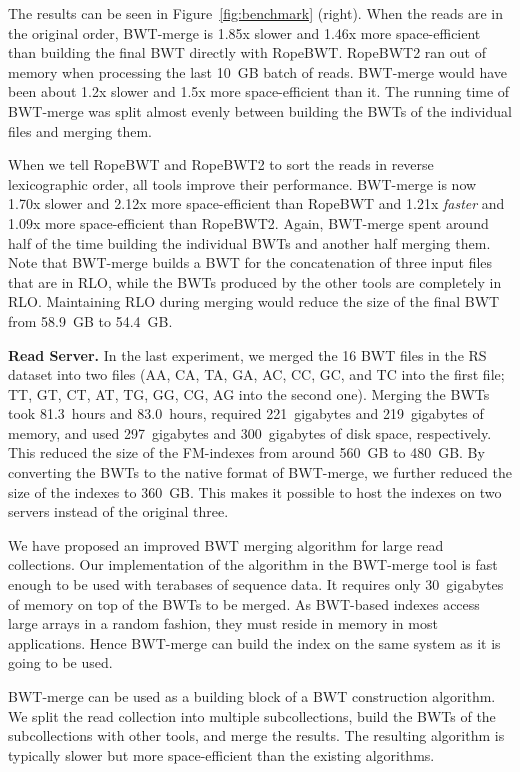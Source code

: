 \documentclass[smallabstract,smallcaptions]{dccpaper}
\newcommand{\BWT}{\textsf{BWT}}
\newcommand{\BWTmerge}{\textsf{BWT\nobreakdash-merge}}
\newcommand{\ropebwt}{\textsf{RopeBWT}}
\newcommand{\RS}{\textsf{RS}}
\begin{document}
The results can be seen in Figure~\ref{fig:benchmark} (right). When the reads are in the original order, \BWTmerge{} is 1.85x slower and 1.46x more space-efficient than building the final \BWT{} directly with \ropebwt. \ropebwt2{} ran out of memory when processing the last 10~GB batch of reads. \BWTmerge{} would have been about 1.2x slower and 1.5x more space-efficient than it. The running time of \BWTmerge{} was split almost evenly between building the \BWT{}s of the individual files and merging them.

When we tell \ropebwt{} and \ropebwt2{} to sort the reads in reverse lexicographic order, all tools improve their performance. \BWTmerge{} is now 1.70x slower and 2.12x more space-efficient than \ropebwt{} and 1.21x \emph{faster} and 1.09x more space-efficient than \ropebwt2. Again, \BWTmerge{} spent around half of the time building the individual \BWT{}s and another half merging them. Note that \BWTmerge{} builds a \BWT{} for the concatenation of three input files that are in RLO, while the \BWT{}s produced by the other tools are completely in RLO. Maintaining RLO during merging would reduce the size of the final \BWT{} from 58.9~GB to 54.4~GB.

\smallbreak\noindent\textbf{Read Server.} In the last experiment, we merged the 16 \BWT{} files in the \RS{} dataset into two files (AA, CA, TA, GA, AC, CC, GC, and TC into the first file; TT, GT, CT, AT, TG, GG, CG, AG into the second one). Merging the \BWT{}s took 81.3~hours and 83.0~hours, required 221~gigabytes and 219~gigabytes of memory, and used 297~gigabytes and 300~gigabytes of disk space, respectively. This reduced the size of the FM-indexes from around 560~GB to 480~GB. By converting the \BWT{}s to the native format of \BWTmerge{}, we further reduced the size of the indexes to 360~GB. This makes it possible to host the indexes on two servers instead of the original three.



We have proposed an improved \BWT{} merging algorithm for large read collections. Our implementation of the algorithm in the \BWTmerge{} tool is fast enough to be used with terabases of sequence data. It requires only 30~gigabytes of memory on top of the \BWT{}s to be merged. As \BWT-based indexes access large arrays in a random fashion, they must reside in memory in most applications. Hence \BWTmerge{} can build the index on the same system as it is going to be used.

\BWTmerge{} can be used as a building block of a \BWT{} construction algorithm. We split the read collection into multiple subcollections, build the \BWT{}s of the subcollections with other tools, and merge the results. The resulting algorithm is typically slower but more space-efficient than the existing algorithms.
\end{document}
